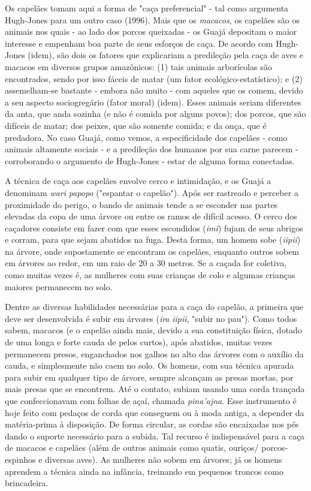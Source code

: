Os capelães tomam aqui a forma de "caça preferencial" - tal como
argumenta Hugh-Jones para um outro caso (1996). Mais que os
\emph{macacos}, os capelães são os animais nos quais - ao lado dos
porcos queixadas - os Guajá depositam o maior interesse e empenham boa
parte de seus esforços de caça. De acordo com Hugh-Jones (idem), são
dois os fatores que explicariam a predileção pela caça de aves e macacos
em diversos grupos amazônicos: (1) tais animais arborícolas são
encontrados, sendo por isso fáceis de matar (um fator
ecológico-estatístico); e (2) assemelham-se bastante - embora não muito
- com aqueles que os comem, devido a seu aspecto sociogregário (fator
moral) (idem). Esses animais seriam diferentes da anta, que anda sozinha
(e não é comida por alguns povos); dos porcos, que são difíceis de
matar; dos peixes, que são somente comida; e da onça, que é predadora.
No caso Guajá, como vemos, a especificidade dos capelães - como animais
altamente sociais - e a predileção dos humanos por sua carne parecem -
corroborando o argumento de Hugh-Jones - estar de alguma forma
conectadas.

A técnica de caça aos capelães envolve cerco e intimidação, e os Guajá a
denominam \emph{wari} \emph{papopo} ("espantar o capelão"). Após ser
rastreado e perceber a proximidade do perigo, o bando de animais tende a
se esconder nas partes elevadas da copa de uma árvore ou entre os ramos
de difícil acesso. O cerco dos caçadores consiste em fazer com que esses
escondidos (\emph{imĩ}) fujam de seus abrigos e corram, para que sejam
abatidos na fuga. Desta forma, um homem sobe (\emph{iipii}) na árvore,
onde supostamente se encontram os capelães, enquanto outros sobem em
árvores ao redor, em um raio de 20 a 30 metros. Se a caçada for
coletiva, como muitas vezes é, as mulheres com suas crianças de colo e
algumas crianças maiores permanecem no solo.

Dentre as diversas habilidades necessárias para a caça do capelão, a
primeira que deve ser desenvolvida é subir em árvores (\emph{ira}
\emph{iipii}, "subir no pau"). Como todos sabem, macacos (e o capelão
ainda mais, devido a sua constituição física, dotado de uma longa e
forte cauda de pelos curtos), após abatidos, muitas vezes permanecem
presos, enganchados nos galhos no alto das árvores com o auxílio da
cauda, e simplesmente não caem no solo. Os homens, com sua técnica
apurada para subir em qualquer tipo de árvore, sempre alcançam as presas
mortas, por mais presas que se encontrem. Até o contato, subiam usando
uma corda trançada que confeccionavam com folhas de açaí, chamada
\emph{pina'ajna}. Esse instrumento é hoje feito com pedaços de corda que
conseguem ou à moda antiga, a depender da matéria-prima à disposição. De
forma circular, as cordas são encaixadas nos pés dando o suporte
necessário para a subida. Tal recurso é indispensável para a caça de
macacos e capelães (além de outros animais como quatis, ouriços/
porcos-espinhos e diversas aves). As mulheres não sobem em árvores; já
os homens aprendem a técnica ainda na infância, treinando em pequenos
troncos como brincadeira.

